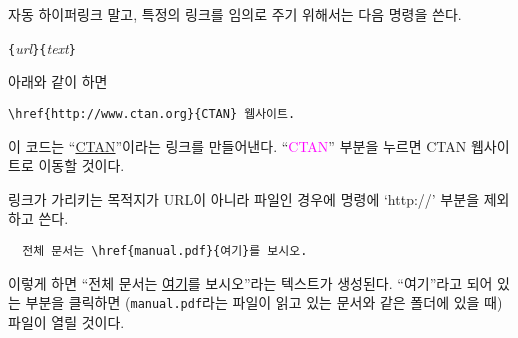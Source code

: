 
자동 하이퍼링크 말고, 특정의 링크를 임의로 주기 위해서는 다음 명령을 쓴다.
\begin{lscommand}
\verb|{|\emph{url}\verb|}{|\emph{text}\verb|}|
\end{lscommand}

아래와 같이 하면
\begin{code}
\begin{verbatim}
\href{http://www.ctan.org}{CTAN} 웹사이트.
\end{verbatim}
\end{code}
이 코드는 ``\href{http://www.ctan.org}{CTAN}''이라는 링크를 만들어낸다.
``\textcolor{magenta}{CTAN}'' 부분을 누르면 CTAN 웹사이트로 이동할 것이다.

링크가 가리키는 목적지가 URL이 아니라 파일인 경우에  명령에 `http://' 부분을 제외하고 쓴다.
\begin{verbatim}
  전체 문서는 \href{manual.pdf}{여기}를 보시오.
\end{verbatim}
이렇게 하면 ``전체 문서는 \href{manual.pdf}{여기}를 보시오''라는 텍스트가 생성된다. ``여기''라고 되어 있는 부분을 클릭하면 (\verb|manual.pdf|라는 파일이 읽고 있는 문서와 같은 폴더에 있을 때) 파일이 열릴 것이다.

